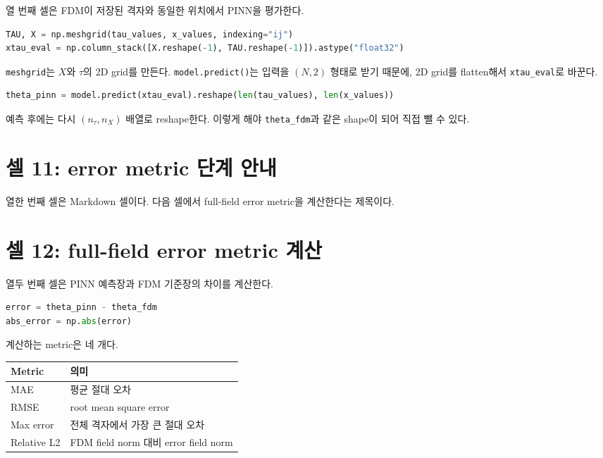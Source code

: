 \documentclass[11pt]{article}
\begin{document}
열 번째 셀은 FDM이 저장된 격자와 동일한 위치에서 PINN을 평가한다.

\begin{lstlisting}[language=Python]
TAU, X = np.meshgrid(tau_values, x_values, indexing="ij")
xtau_eval = np.column_stack([X.reshape(-1), TAU.reshape(-1)]).astype("float32")
\end{lstlisting}

\texttt{meshgrid}는 \(X\)와 \(\tau\)의 2D grid를 만든다.
\texttt{model.predict()}는 입력을 \((N,2)\) 형태로 받기 때문에, 2D grid를 flatten해서 \texttt{xtau\_eval}로 바꾼다.

\begin{lstlisting}[language=Python]
theta_pinn = model.predict(xtau_eval).reshape(len(tau_values), len(x_values))
\end{lstlisting}

예측 후에는 다시 \((n_{\tau}, n_X)\) 배열로 reshape한다.
이렇게 해야 \texttt{theta\_fdm}과 같은 shape이 되어 직접 뺄 수 있다.

\section{셀 11: error metric 단계 안내}

열한 번째 셀은 Markdown 셀이다.
다음 셀에서 full-field error metric을 계산한다는 제목이다.

\section{셀 12: full-field error metric 계산}

열두 번째 셀은 PINN 예측장과 FDM 기준장의 차이를 계산한다.

\begin{lstlisting}[language=Python]
error = theta_pinn - theta_fdm
abs_error = np.abs(error)
\end{lstlisting}

계산하는 metric은 네 개다.

\begin{center}
\begin{tabular}{ll}
\toprule
Metric & 의미 \\
\midrule
MAE & 평균 절대 오차 \\
RMSE & root mean square error \\
Max error & 전체 격자에서 가장 큰 절대 오차 \\
Relative L2 & FDM field norm 대비 error field norm \\
\bottomrule
\end{tabular}
\end{center}
\end{document}
